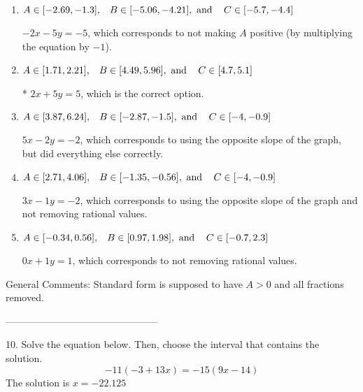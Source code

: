 \documentclass{extbook}[14pt]
\begin{document}
\begin{enumerate}[label=\Alph*.] 
\item $ A \in [-2.69, -1.3], \hspace{3mm} B \in [-5.06, -4.21], \text{ and } \hspace{3mm} C \in [-5.7, -4.4] $ 

  $-2x - 5y = -5$, which corresponds to not making $A$ positive (by multiplying the equation by $-1$). 
\item $ A \in [1.71, 2.21], \hspace{3mm} B \in [4.49, 5.96], \text{ and } \hspace{3mm} C \in [4.7, 5.1] $ 

 * $2x + 5y = 5$, which is the correct option. 
\item $ A \in [3.87, 6.24], \hspace{3mm} B \in [-2.87, -1.5], \text{ and } \hspace{3mm} C \in [-4, -0.9] $ 

  $5x - 2y = -2$, which corresponds to using the opposite slope of the graph, but did everything else correctly. 
\item $ A \in [2.71, 4.06], \hspace{3mm} B \in [-1.35, -0.56], \text{ and } \hspace{3mm} C \in [-4, -0.9] $ 

  $3x - 1y = -2$, which corresponds to using the opposite slope of the graph and not removing rational values. 
\item $ A \in [-0.34, 0.56], \hspace{3mm} B \in [0.97, 1.98], \text{ and } \hspace{3mm} C \in [-0.7, 2.3] $ 

  $0x + 1y = 1$, which corresponds to not removing rational values. 
\end{enumerate} 
 
General Comments: Standard form is supposed to have $A > 0$ and all fractions removed.

-----------------------------------------------

10. Solve the equation below. Then, choose the interval that contains the solution.
\[ -11(-3+13 x) = -15(9 x-14) \] 
The solution is $ x = -22.125 $ 
\end{document}

